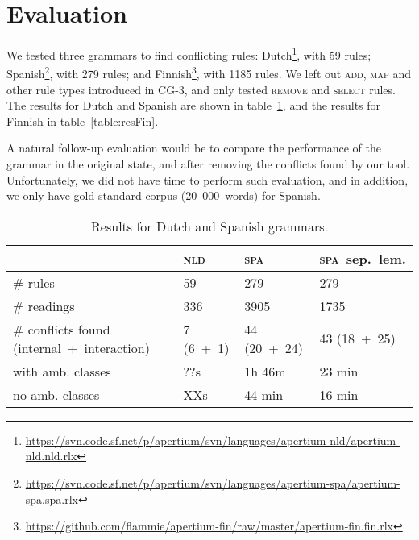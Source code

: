 \section{Evaluation}
\label{sec:eval}

We tested three grammars to find conflicting rules: 
Dutch\footnote{\scriptsize{\url{https://svn.code.sf.net/p/apertium/svn/languages/apertium-nld/apertium-nld.nld.rlx}}},
with 59 rules; 
Spanish\footnote{\scriptsize{\url{https://svn.code.sf.net/p/apertium/svn/languages/apertium-spa/apertium-spa.spa.rlx}}},
with 279 rules; and 
Finnish\footnote{\scriptsize{\url{https://github.com/flammie/apertium-fin/raw/master/apertium-fin.fin.rlx}}},
with 1185 rules. We left out \textsc{add}, \textsc{map} and other rule
types introduced in CG-3, and only tested \textsc{remove} and \textsc{select} rules.
The results for Dutch and Spanish are shown in table~\ref{table:res},
and the results for Finnish in table~\ref{table:resFin}.

A natural follow-up evaluation would be to compare the performance of the
grammar in the original state, and after removing the conflicts found
by our tool. Unfortunately, we did not have time to perform such
evaluation, and in addition, we only have gold standard corpus (20~000~words) for Spanish.



\begin{table}[]
\centering
\begin{tabular}{|p{2.84cm}|p{1cm}|p{1.15cm}|p{1.55cm}|}

\hline
                   & \textsc{nld}  & \textsc{spa}  & \textsc{spa}~\small{sep.~lem.} \\ \hline
\# rules           & 59            & 279       & 279     \\ \hline
\# readings        & 336           & 3905      & 1735    \\ \hline
\# conflicts found \small{(internal~+~interaction)}
                   & 7 \small{(6~+~1)}     & 44 \small{(20~+~24)}     & 43 \small{(18~+~25)} \\ \hline

\clock{} with amb. 
           classes & ??s           & 1h 46m    &  23 min  \\ \hline

\clock{} no amb. 
           classes & XXs        & 44 min       & 16 min     \\ \hline 


\end{tabular}
\caption{Results for Dutch and Spanish grammars.}
\label{table:res}
\end{table}




